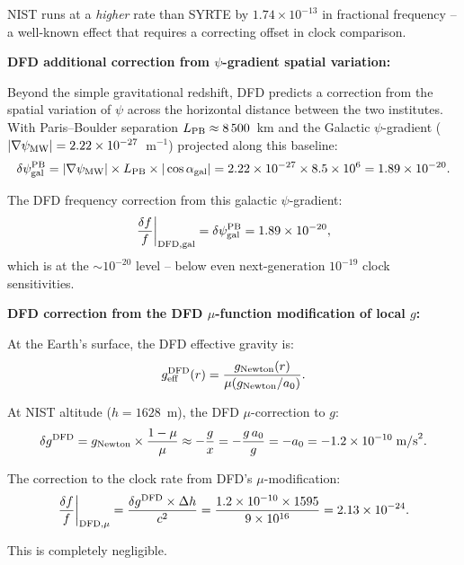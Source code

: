 \documentclass[aps,prd,twocolumn,superscriptaddress,nofootinbib]{revtex4-2}
\begin{document}
NIST runs at a \emph{higher} rate than SYRTE by $1.74\times10^{-13}$
in fractional frequency -- a well-known effect that requires a
correcting offset in clock comparison.

\textbf{DFD additional correction from $\psi$-gradient spatial variation:}

Beyond the simple gravitational redshift, DFD predicts a correction
from the spatial variation of $\psi$ across the horizontal distance
between the two institutes. With Paris--Boulder separation
$L_{\rm PB} \approx 8\,500$~km and the Galactic $\psi$-gradient
($|\nabla\psi_{\rm MW}| = 2.22\times10^{-27}$~m$^{-1}$) projected
along this baseline:
\begin{equation}
\delta\psi_{\rm gal}^{\rm PB}
= |\nabla\psi_{\rm MW}|\times L_{\rm PB}\times|\cos\alpha_{\rm gal}|
= 2.22\times10^{-27}\times8.5\times10^6
= 1.89\times10^{-20}.
\end{equation}

The DFD frequency correction from this galactic $\psi$-gradient:
\begin{equation}
\frac{\delta f}{f}\bigg|_{\rm DFD,gal}
= \delta\psi_{\rm gal}^{\rm PB} = 1.89\times10^{-20},
\label{eq:syrte_nist_dfd_gal}
\end{equation}
which is at the $\sim 10^{-20}$ level -- below even next-generation
$10^{-19}$ clock sensitivities.

\textbf{DFD correction from the DFD $\mu$-function modification of local $g$:}

At the Earth's surface, the DFD effective gravity is:
\begin{equation}
g_{\rm eff}^{\rm DFD}(r)
= \frac{g_{\rm Newton}(r)}{\mu(g_{\rm Newton}/a_0)}.
\end{equation}

At NIST altitude ($h = 1628$~m), the DFD $\mu$-correction to $g$:
\begin{equation}
\delta g^{\rm DFD}
= g_{\rm Newton}\times\frac{1-\mu}{\mu}
\approx -\frac{g}{x} = -\frac{g\,a_0}{g}
= -a_0 = -1.2\times10^{-10}\;\text{m/s}^2.
\end{equation}

The correction to the clock rate from DFD's $\mu$-modification:
\begin{equation}
\frac{\delta f}{f}\bigg|_{\rm DFD,\mu}
= \frac{\delta g^{\rm DFD}\times\Delta h}{c^2}
= \frac{1.2\times10^{-10}\times1595}{9\times10^{16}}
= 2.13\times10^{-24}.
\end{equation}

This is completely negligible.
\end{document}
